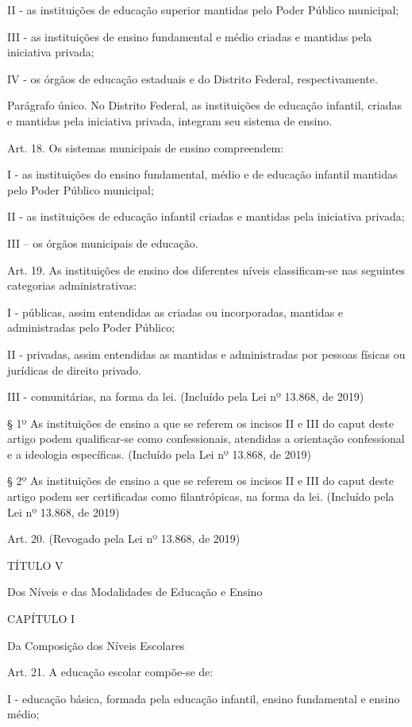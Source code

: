 \documentclass[
]{book}
\begin{document}
II - as instituições de educação superior mantidas pelo Poder Público municipal;

III - as instituições de ensino fundamental e médio criadas e mantidas pela iniciativa privada;

IV - os órgãos de educação estaduais e do Distrito Federal, respectivamente.

Parágrafo único. No Distrito Federal, as instituições de educação infantil, criadas e mantidas pela iniciativa privada, integram seu sistema de ensino.

Art. 18. Os sistemas municipais de ensino compreendem:

I - as instituições do ensino fundamental, médio e de educação infantil mantidas pelo Poder Público municipal;

II - as instituições de educação infantil criadas e mantidas pela iniciativa privada;

III -- os órgãos municipais de educação.

Art. 19. As instituições de ensino dos diferentes níveis classificam-se nas seguintes categorias administrativas:

I - públicas, assim entendidas as criadas ou incorporadas, mantidas e administradas pelo Poder Público;

II - privadas, assim entendidas as mantidas e administradas por pessoas físicas ou jurídicas de direito privado.

III - comunitárias, na forma da lei. (Incluído pela Lei nº 13.868, de 2019)

§ 1º As instituições de ensino a que se referem os incisos II e III do caput deste artigo podem qualificar-se como confessionais, atendidas a orientação confessional e a ideologia específicas. (Incluído pela Lei nº 13.868, de 2019)

§ 2º As instituições de ensino a que se referem os incisos II e III do caput deste artigo podem ser certificadas como filantrópicas, na forma da lei. (Incluído pela Lei nº 13.868, de 2019)

Art. 20. (Revogado pela Lei nº 13.868, de 2019)

TÍTULO V

Dos Níveis e das Modalidades de Educação e Ensino

CAPÍTULO I

Da Composição dos Níveis Escolares

Art. 21. A educação escolar compõe-se de:

I - educação básica, formada pela educação infantil, ensino fundamental e ensino médio;
\end{document}
